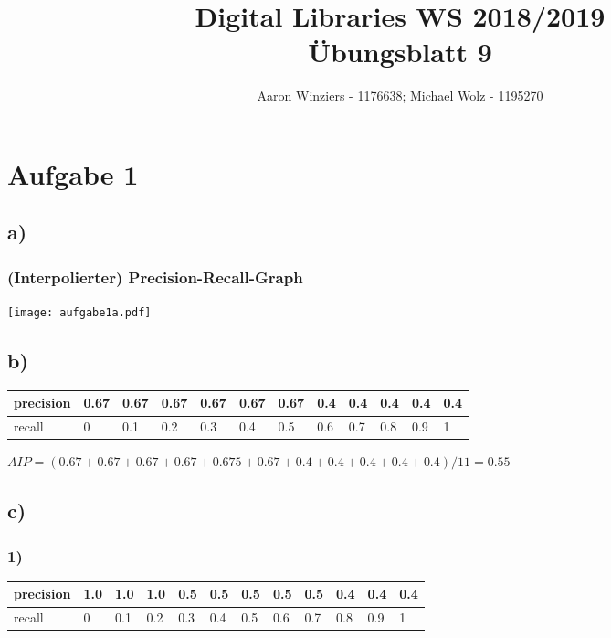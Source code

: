 \documentclass[11pt,a4paper,parskip=half ]{scrartcl}
\author{Aaron Winziers - 1176638; Michael Wolz - 1195270}
\title{Digital Libraries WS 2018/2019\\\LARGE{Übungsblatt 9}}
\begin{document}
	\maketitle
	
	\section*{Aufgabe 1}
	
	\subsection*{a)}
	 
	\subsubsection*{(Interpolierter) Precision-Recall-Graph}
	\texttt{[image: aufgabe1a.pdf]}

	\subsection*{b)}
	
	\begin{table}[H]
		\begin{tabular}{|l|l|l|l|l|l|l|l|l|l|l|l|}
			\hline
			precision & 0.67 & 0.67 & 0.67 & 0.67 & 0.67 & 0.67 & 0.4 & 0.4 & 0.4 & 0.4 & 0.4 \\ \hline
			recall    & 0    & 0.1  & 0.2  & 0.3  & 0.4  & 0.5  & 0.6 & 0.7 & 0.8 & 0.9 & 1   \\ \hline
		\end{tabular}
	\end{table}
	
	$AIP = (0.67 + 0.67 + 0.67 + 0.67 + 0.675 + 0.67 + 0.4 + 0.4 + 0.4 + 0.4 + 0.4) / 11 = 0.55$
	
	\subsection*{c)}
		
	\subsubsection*{1)}
	
	\begin{table}[H]
		\begin{tabular}{|l|l|l|l|l|l|l|l|l|l|l|l|}
			\hline
			precision & 1.0 & 1.0 & 1.0 & 0.5 & 0.5 & 0.5 & 0.5 & 0.5 & 0.4 & 0.4 & 0.4 \\ \hline
			recall    & 0   & 0.1 & 0.2 & 0.3 & 0.4 & 0.5 & 0.6 & 0.7 & 0.8 & 0.9 & 1   \\ \hline
		\end{tabular}
	\end{table}
\end{document}
